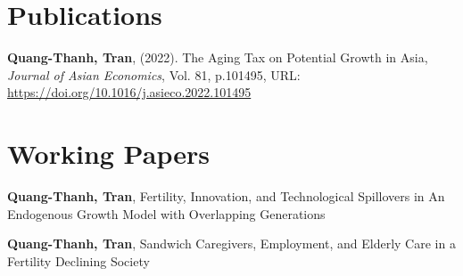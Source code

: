 \section{\sc Publications}
\begin{etaremune}[]
\item
  {\bf Quang-Thanh, Tran},
  (2022).
  {The Aging Tax on Potential Growth in Asia},
  {\it Journal of Asian Economics}, Vol. 81, p.101495,
  {URL: \url{https://doi.org/10.1016/j.asieco.2022.101495}}
\end{etaremune}

\vspace{4mm}

\section{\sc Working Papers}
\begin{etaremune}[]
\item
  {\bf Quang-Thanh, Tran},
  {Fertility, Innovation, and Technological Spillovers  in An Endogenous Growth Model with Overlapping Generations}
\item
  {\bf Quang-Thanh, Tran},
  {Sandwich Caregivers, Employment, and Elderly Care in a Fertility Declining Society} 
\end{etaremune}


